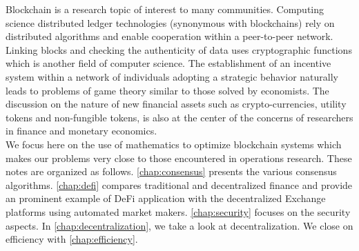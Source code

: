 \noindent Blockchain is a research topic of interest to many communities. Computing science distributed ledger technologies (synonymous with blockchains) rely on distributed algorithms and enable cooperation within a peer-to-peer network. Linking blocks and checking the authenticity of data uses cryptographic functions which is another field of computer science. The establishment of an incentive system within a network of individuals adopting a strategic behavior naturally leads to problems of game theory similar to those solved by economists. The discussion on the nature of new financial assets such as crypto-currencies, utility tokens and non-fungible tokens, is also at the center of the concerns of researchers in finance and monetary economics. \\

\noindent We focus here on the use of mathematics to optimize blockchain systems which makes our problems very close to those encountered in operations research. These notes are organized as follows. \cref{chap:consensus} presents the various consensus algorithms. \cref{chap:defi} compares traditional and decentralized finance and provide an prominent example of DeFi application with the decentralized Exchange platforms using automated market makers. \cref{chap:security} focuses on the security aspects. In \cref{chap:decentralization}, we take a look at decentralization. We close on efficiency with \cref{chap:efficiency}.

\newpage